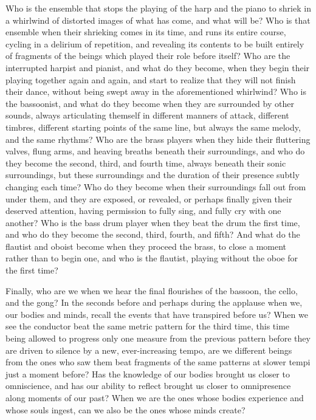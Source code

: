 \documentclass[11pt]{article}
\begin{document}
\begingroup
\begin{center}
Who is the ensemble that stops the playing of the harp and the piano to shriek in a whirlwind of distorted images of what has come, and what will be? Who is that ensemble when their shrieking comes in its time, and runs its entire course, cycling in a delirium of repetition, and revealing its contents to be built entirely of fragments of the beings which played their role before itself? Who are the interrupted harpist and pianist, and what do they become, when they begin their playing together again and again, and start to realize that they will not finish their dance, without being swept away in the aforementioned whirlwind? Who is the bassoonist, and what do they become when they are surrounded by other sounds, always articulating themself in different manners of attack, different timbres, different starting points of the same line, but always the same melody, and the same rhythms? Who are the brass players when they hide their fluttering valves, flung arms, and heaving breaths beneath their surroundings, and who do they become the second, third, and fourth time, always beneath their sonic surroundings, but these surroundings and the duration of their presence subtly changing each time? Who do they become when their surroundings fall out from under them, and they are exposed, or revealed, or perhaps finally given their deserved attention, having permission to fully sing, and fully cry with one another? Who is the bass drum player when they beat the drum the first time, and who do they become the second, third, fourth, and fifth? And what do the flautist and oboist become when they proceed the brass, to close a moment rather than to begin one, and who is the flautist, playing without the oboe for the first time?
\end{center}
\endgroup

\begingroup
\begin{center}
Finally, who are we when we hear the final flourishes of the bassoon, the cello, and the gong? In the seconds before and perhaps during the applause when we, our bodies and minds, recall the events that have transpired before us? When we see the conductor beat the same metric pattern for the third time, this time being allowed to progress only one measure from the previous pattern before they are driven to silence by a new, ever-increasing tempo, are we different beings from the ones who saw them beat fragments of the same patterns at slower tempi just a moment before? Has the knowledge of our bodies brought us closer to omniscience, and has our ability to reflect brought us closer to omnipresence along moments of our past? When we are the ones whose bodies experience and whose souls ingest, can we also be the ones whose minds create?
\end{center}
\endgroup
\end{document}
